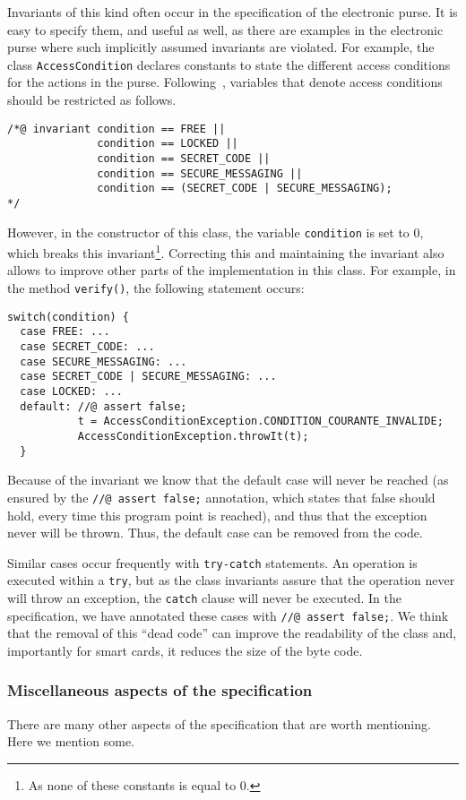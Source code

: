 \documentclass[a4paper]{llncs}
\begin{document}
Invariants of this kind often occur in the specification of the
electronic purse. It is easy to specify them, and useful as well, as
there are examples in the electronic purse where such implicitly assumed
invariants are violated.
For example, the class \texttt{AccessCondition} declares constants to
state the different access conditions for the actions in the
purse. Following~\cite{BretagneMGL00}, variables that denote access conditions
should be restricted as follows.
\begin{verbatim}
/*@ invariant condition == FREE ||
              condition == LOCKED ||
              condition == SECRET_CODE ||
              condition == SECURE_MESSAGING ||
              condition == (SECRET_CODE | SECURE_MESSAGING);
*/
\end{verbatim}

However, in the constructor of this class, the variable
\texttt{condition} is set to 0, which breaks this
invariant\footnote{As none of these constants is equal to
0.}. Correcting this and maintaining the invariant also allows to
improve other parts of the implementation in this class. For example,
in the method \texttt{verify()}, the following statement occurs:
\begin{verbatim}
switch(condition) {
  case FREE: ...
  case SECRET_CODE: ...
  case SECURE_MESSAGING: ...
  case SECRET_CODE | SECURE_MESSAGING: ...
  case LOCKED: ...
  default: //@ assert false;
           t = AccessConditionException.CONDITION_COURANTE_INVALIDE;
           AccessConditionException.throwIt(t);
  }
\end{verbatim}
Because of the invariant we know that the default case will never
be reached (as ensured by the \texttt{//@ assert false;} annotation,
which states that false should hold, every time this program point is
reached), and thus that the exception never will be thrown. Thus, the
default case can be removed from the code.

Similar cases occur frequently with \texttt{try-catch} statements. An
operation is executed within a \texttt{try}, but as the class invariants
assure that the operation never will throw an exception, the
\texttt{catch} clause will never be executed. In the specification, we 
have annotated these cases with \texttt{//@ assert false;}. We think
that the removal of this ``dead code'' can improve the readability of
the class and, importantly for smart cards, it reduces the 
size of the byte code.


\subsubsection{Miscellaneous aspects of the specification}
There are many other aspects of the specification that are worth
mentioning. Here we mention some.
\end{document}
